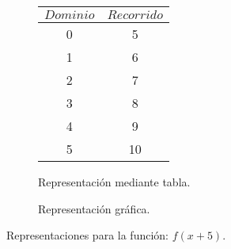\begin{figure}[h]
\centering
\begin{subfigure}[A]{0.3\textwidth}
\centering
\begin{tabular}{c|c}
$Dominio$ & $Recorrido$ \\ \hline
\hline
0 & 5 \\ \hline
1 & 6 \\ \hline
2 & 7 \\ \hline
3 & 8 \\ \hline
4 & 9 \\ \hline
5 & 10 \\ \hline
\end{tabular} 
\caption{Representación mediante tabla.}

\end{subfigure}%
\quad
\begin{subfigure}[B]{0.3\textwidth}
\centering



\caption{Representación gráfica.}

\end{subfigure}

\caption{Representaciones para la función: $f(x+5)$.}

\end{figure}

